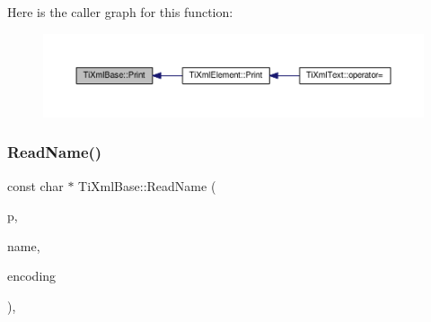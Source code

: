 Here is the caller graph for this function\+:\nopagebreak
\begin{figure}[H]
\begin{center}
\leavevmode
\includegraphics[width=350pt]{class_ti_xml_base_a0de56b3f2ef14c65091a3b916437b512_icgraph}
\end{center}
\end{figure}
\mbox{\label{class_ti_xml_base_a1c21a6ab5f7b503acd91f35f183734b3}} 
\subsubsection{\texorpdfstring{Read\+Name()}{ReadName()}}
{\footnotesize\ttfamily const char $\ast$ Ti\+Xml\+Base\+::\+Read\+Name (\begin{DoxyParamCaption}\item[{const char $\ast$}]{p,  }\item[{\hyperlink{tinyxml_8h_a92bada05fd84d9a0c9a5bbe53de26887}{T\+I\+X\+M\+L\+\_\+\+S\+T\+R\+I\+NG} $\ast$}]{name,  }\item[{\hyperlink{tinyxml_8h_a88d51847a13ee0f4b4d320d03d2c4d96}{Ti\+Xml\+Encoding}}]{encoding }\end{DoxyParamCaption})\hspace{0.3cm}{\ttfamily [static]}, {\ttfamily [protected]}}

